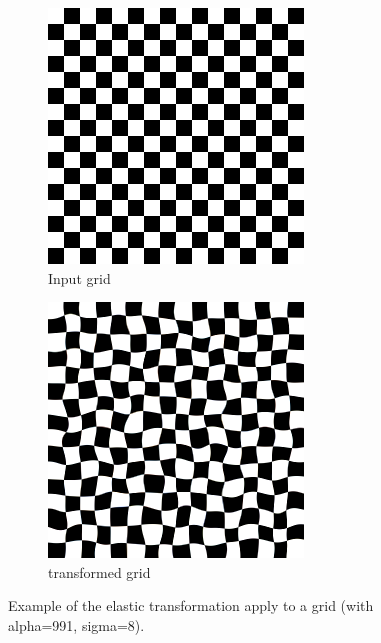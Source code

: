\begin{figure}
\centering
\begin{subfigure}{.4\textwidth}
  \centering
  \includegraphics[width=1\linewidth]{figures/preprocessing/elastic_transform_input.png}
  \caption{Input grid}
  \label{fig:input_elastic_transform}
\end{subfigure}%
\hfill
\begin{subfigure}{.4\textwidth}
  \centering
  \includegraphics[width=1\linewidth]{figures/preprocessing/elastic_transform.png}
  \caption{transformed grid}
  \label{fig:output_elastic_transfor}
\end{subfigure}
\caption[Elastic]{Example\footnotemark{} of the elastic transformation apply to a grid (with alpha=991, sigma=8).}
\label{fig:elastic_transform}
\end{figure}

